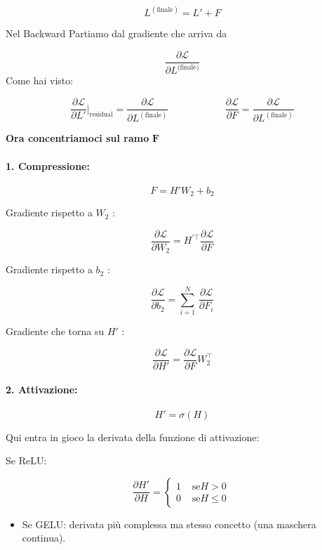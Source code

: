 \documentclass[
  11pt,
]{article}
\begin{document}
\[L^{(\text{finale})} = L' + F\]

Nel Backward Partiamo dal gradiente che arriva da

\[\frac{\partial\mathcal{L}}{\partial L^{\text{(finale)}}}
\]Come hai visto:

\[\frac{\partial\mathcal{L}}{\partial L'}\Big|_{\text{residual}} = \frac{\partial\mathcal{L}}{\partial L^{(\text{finale})}}\ \ \ \ \ \ \ \ \ \ \ \ \ \ \ \ \ \ \ \ \ \ \ \ \ \ \frac{\partial\mathcal{L}}{\partial F} = \frac{\partial\mathcal{L}}{\partial L^{(\text{finale})}}\]

\textbf{Ora concentriamoci sul ramo} \(\mathbf{F}\)

\paragraph{1. \textbf{Compressione:}}


\[F = H'W_{2} + b_{2}\]


Gradiente rispetto a \(W_{2}\) :


\[\frac{\partial\mathcal{L}}{\partial W_{2}} = H^{'\top}\frac{\partial\mathcal{L}}{\partial F}\]


Gradiente rispetto a \(b_{2}\) :


\[\frac{\partial\mathcal{L}}{\partial b_{2}} = \sum_{i = 1}^{N}\,\frac{\partial\mathcal{L}}{\partial F_{i}}\]


Gradiente che torna su \(H'\) :


\[\frac{\partial\mathcal{L}}{\partial H'} = \frac{\partial\mathcal{L}}{\partial F}W_{2}^{\top}\]


\paragraph{2. \textbf{Attivazione:}}


\[H' = \sigma(H)\]

Qui entra in gioco la derivata della funzione di attivazione:


Se ReLU:


\[\frac{\partial H'}{\partial H} = \left\{ \begin{matrix}
1 & \text{ se}H > 0 \\
0 & \text{ se}H \leq 0
\end{matrix} \right.\ \]


\begin{itemize}
\item
  Se GELU: derivata più complessa ma stesso concetto (una maschera
  continua).
\end{itemize}
\end{document}
